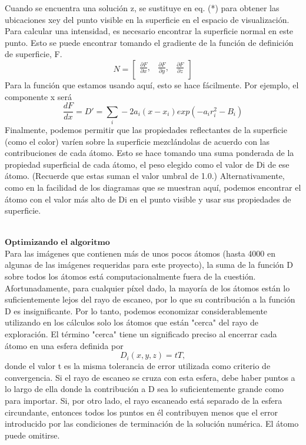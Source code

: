 Cuando se encuentra una solución z, se sustituye en eq. (*) para obtener las ubicaciones xey del punto visible en la superficie en el espacio de visualización. Para calcular una intensidad, es necesario encontrar la superficie normal en este punto. Esto se puede encontrar tomando el gradiente de la función de definición de superficie, F.
\[
	N = \left[ {\begin{array}{ccc}
		\frac{\partial F}{\partial x}, & \frac{\partial F}{\partial y}, & \frac{\partial F}{\partial z} \\
		\end{array} } \right]
\]
Para la función que estamos usando aquí, esto se hace fácilmente. Por ejemplo, el componente x será
\[
	\frac{dF}{dx} = D' = \sum_{i} -2 a_i (x - x_i) exp(-a_i r^{2}_{i} - B_i)
\]
Finalmente, podemos permitir que las propiedades reflectantes de la superficie (como el color) varíen sobre la superficie mezclándolas de acuerdo con las contribuciones de cada átomo. Esto se hace tomando una suma ponderada de la propiedad superficial de cada átomo, el peso elegido como el valor de Di de ese átomo. (Recuerde que estas suman el valor umbral de 1.0.) Alternativamente, como en la facilidad de los diagramas que se muestran aquí, podemos encontrar el átomo con el valor más alto de Di en el punto visible y usar sus propiedades de superficie.

${ }$\\
$\textbf{Optimizando el algoritmo}$
${ }$\\

Para las imágenes que contienen más de unos pocos átomos (hasta 4000 en algunas de las imágenes requeridas para este proyecto), la suma de la función D sobre todos los átomos está computacionalmente fuera de la cuestión. Afortunadamente, para cualquier píxel dado, la mayoría de los átomos están lo suficientemente lejos del rayo de escaneo, por lo que su contribución a la función D es insignificante. Por lo tanto, podemos economizar considerablemente utilizando en los cálculos solo los átomos que están "cerca" del rayo de exploración. El término "cerca" tiene un significado preciso al encerrar cada átomo en una esfera definida por
\[
	D_i (x,y,z) = tT,
\]
donde el valor t es la misma tolerancia de error utilizada como criterio de convergencia. Si el rayo de escaneo se cruza con esta esfera, debe haber puntos a lo largo de ella donde la contribución a D sea lo suficientemente grande como para importar. Si, por otro lado, el rayo escaneado está separado de la esfera circundante, entonces todos los puntos en él contribuyen menos que el error introducido por las condiciones de terminación de la solución numérica. El átomo puede omitirse.

